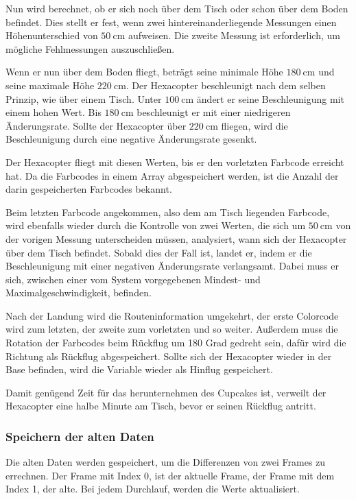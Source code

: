     Nun wird berechnet, ob er sich noch über dem Tisch oder schon über dem Boden befindet. Dies stellt er fest, wenn zwei hintereinanderliegende Messungen einen Höhenunterschied von $\SI{50}{\centi\metre}$ aufweisen. Die zweite Messung ist erforderlich, um mögliche Fehlmessungen auszuschließen.

    Wenn er nun über dem Boden fliegt, beträgt seine minimale Höhe $\SI{180}{\centi\metre}$ und seine maximale Höhe $\SI{220}{\centi\metre}$.
    Der Hexacopter beschleunigt nach dem selben Prinzip, wie über einem Tisch. Unter $\SI{100}{\centi\metre}$ ändert er seine Beschleunigung mit einem hohen Wert. Bis $\SI{180}{\centi\metre}$ beschleunigt er mit einer niedrigeren Änderungsrate. Sollte der Hexacopter über $\SI{220}{\centi\metre}$ fliegen, wird die Beschleunigung durch eine negative Änderungsrate gesenkt.

    Der Hexacopter fliegt mit diesen Werten, bis er den vorletzten Farbcode erreicht hat. Da die Farbcodes in einem Array abgespeichert werden, ist die Anzahl der darin gespeicherten Farbcodes bekannt.

    Beim letzten Farbcode angekommen, also dem am Tisch liegenden Farbcode, wird ebenfalls wieder durch die Kontrolle von zwei Werten, die sich um $\SI{50}{\centi\metre}$ von der vorigen Messung unterscheiden müssen, analysiert, wann sich der Hexacopter über dem Tisch befindet. Sobald dies der Fall ist, landet er, indem er die Beschleunigung mit einer negativen Änderungsrate verlangsamt. Dabei muss er sich, zwischen einer vom System vorgegebenen Mindest- und Maximalgeschwindigkeit, befinden.

    Nach der Landung wird die Routeninformation umgekehrt, der erste Colorcode wird zum letzten, der zweite zum vorletzten und so weiter. Außerdem muss die Rotation der Farbcodes beim Rückflug um 180 Grad gedreht sein, dafür wird die Richtung als Rückflug abgespeichert. Sollte sich der Hexacopter wieder in der Base befinden, wird die Variable wieder als Hinflug gespeichert.

    Damit genügend Zeit für das herunternehmen des Cupcakes ist, verweilt der Hexacopter eine halbe Minute am Tisch, bevor er seinen Rückflug antritt.

    \subsubsection{Speichern der alten Daten}
    Die alten Daten werden gespeichert, um die Differenzen von zwei Frames zu errechnen. Der Frame mit Index 0, ist der aktuelle Frame, der Frame mit dem Index 1, der alte. Bei jedem Durchlauf, werden die Werte aktualisiert.

